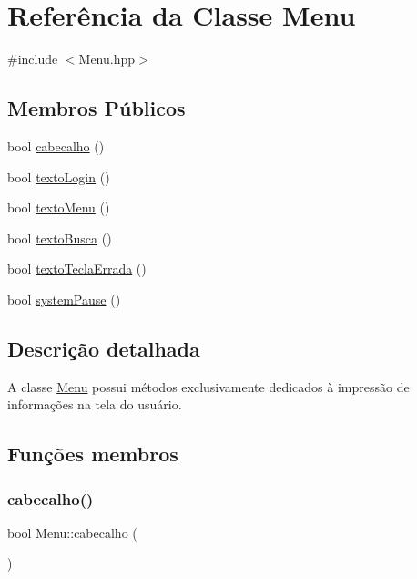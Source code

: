 \hypertarget{class_menu}{}\section{Referência da Classe Menu}
\label{class_menu}


{\ttfamily \#include $<$Menu.\+hpp$>$}

\subsection*{Membros Públicos}
\begin{DoxyCompactItemize}
\item 
bool \mbox{\hyperlink{class_menu_a67e7de2866b3132c68211ec0cd6a2ab4}{cabecalho}} ()
\item 
bool \mbox{\hyperlink{class_menu_ab8fe95eae2d7d6942b27b3e64e6b3ad3}{texto\+Login}} ()
\item 
bool \mbox{\hyperlink{class_menu_a4e3a778de664787b133df5c670504c63}{texto\+Menu}} ()
\item 
bool \mbox{\hyperlink{class_menu_a06f1be568f96653c23109fd1211c9388}{texto\+Busca}} ()
\item 
bool \mbox{\hyperlink{class_menu_ad442d6a0f4e151abd649a7279c4cbc41}{texto\+Tecla\+Errada}} ()
\item 
bool \mbox{\hyperlink{class_menu_a21f77dfb517833a3f0e69043900c7b2e}{system\+Pause}} ()
\end{DoxyCompactItemize}


\subsection{Descrição detalhada}
A classe \mbox{\hyperlink{class_menu}{Menu}} possui métodos exclusivamente dedicados à impressão de informações na tela do usuário. 

\subsection{Funções membros}
\mbox{\label{class_menu_a67e7de2866b3132c68211ec0cd6a2ab4}} 
\subsubsection{\texorpdfstring{cabecalho()}{cabecalho()}}
{\footnotesize\ttfamily bool Menu\+::cabecalho (\begin{DoxyParamCaption}{ }\end{DoxyParamCaption})}

